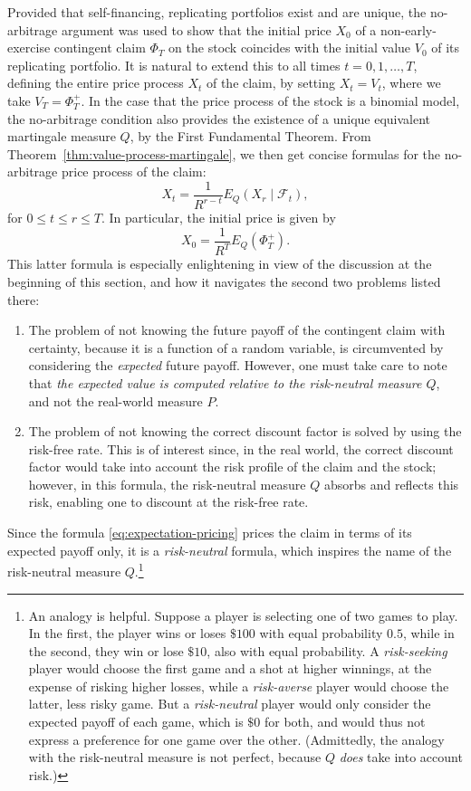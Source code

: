 \documentclass[11pt, openany, oneside]{book}
\theoremstyle{definition}
\theoremstyle{remark}
\theoremstyle{boldital}
\numberwithin{equation}{section}
\begin{document}
Provided that self-financing, replicating portfolios exist and are unique, the no-arbitrage argument was used to show that the initial price $X_0$ of a non-early-exercise contingent claim $\Phi_T$ on the stock coincides with the initial value $V_0$ of its replicating portfolio. It is natural to extend this to all times $t=0,1,\ldots,T$, defining the entire price process $X_t$ of the claim, by setting $X_t=V_t$, where we take $V_T = \Phi_T^+$. In the case that the price process of the stock is a binomial model, the no-arbitrage condition also provides the existence of a unique equivalent martingale measure $Q$, by the First Fundamental Theorem. From Theorem~\ref{thm:value-process-martingale}, we then get concise formulas for the no-arbitrage price process of the claim:
	\begin{equation}\label{eq:martingale-pricing}
	X_t = \frac{1}{R^{r-t}} E_Q\left( X_r \mid \mathcal{F}_t\right),
	\end{equation}
for $0 \leq t \leq r \leq T$. In particular, the initial price is given by
	\begin{equation}\label{eq:expectation-pricing}
	X_0 = \frac{1}{R^T} E_Q\left( \Phi_T^+ \right).
	\end{equation}
This latter formula is especially enlightening in view of the discussion at the beginning of this section, and how it navigates the second two problems listed there:
\begin{enumerate}
\item[(2)] The problem of not knowing the future payoff of the contingent claim with certainty, because it is a function of a random variable, is circumvented by considering the \textit{expected} future payoff. However, one must take care to note that \textit{the expected value is computed relative to the risk-neutral measure $Q$}, and not the real-world measure $P$.
\item[(3)] The problem of not knowing the correct discount factor is solved by using the risk-free rate. This is of interest since, in the real world, the correct discount factor would take into account the risk profile of the claim and the stock; however, in this formula, the risk-neutral measure $Q$ absorbs and reflects this risk, enabling one to discount at the risk-free rate.
\end{enumerate}
Since the formula \eqref{eq:expectation-pricing} prices the claim in terms of its expected payoff only, it is a \textit{risk-neutral} formula, which inspires the name of the risk-neutral measure $Q$.\footnote{An analogy is helpful. Suppose a player is selecting one of two games to play. In the first, the player wins or loses $\$100$ with equal probability $0.5$, while in the second, they win or lose $\$10$, also with equal probability. A \textit{risk-seeking} player would choose the first game and a shot at higher winnings, at the expense of risking higher losses, while a \textit{risk-averse} player would choose the latter, less risky game. But a \textit{risk-neutral} player would only consider the expected payoff of each game, which is $\$0$ for both, and would thus not express a preference for one game over the other. (Admittedly, the analogy with the risk-neutral measure is not perfect, because $Q$ \textit{does} take into account risk.)}
\end{document}
